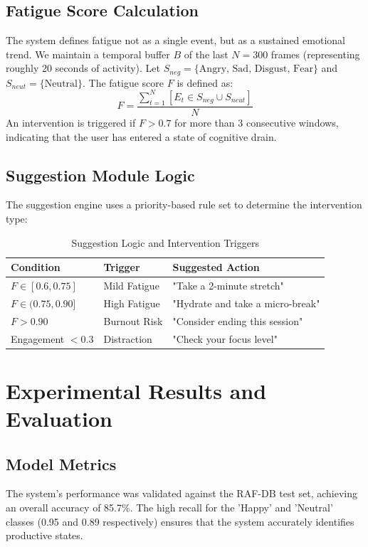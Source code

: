 \documentclass[conference]{IEEEtran}
\begin{document}
\subsection{Fatigue Score Calculation}
The system defines fatigue not as a single event, but as a sustained emotional trend. We maintain a temporal buffer $B$ of the last $N=300$ frames (representing roughly 20 seconds of activity). Let $S_{neg} = \{\text{Angry, Sad, Disgust, Fear}\}$ and $S_{neut} = \{\text{Neutral}\}$. The fatigue score $F$ is defined as:
\begin{equation}
    F = \frac{\sum_{t=1}^{N} [E_t \in S_{neg} \cup S_{neut}]}{N}
\end{equation}
An intervention is triggered if $F > 0.7$ for more than 3 consecutive windows, indicating that the user has entered a state of cognitive drain.

\subsection{Suggestion Module Logic}
The suggestion engine uses a priority-based rule set to determine the intervention type:
\begin{table}[h]
    \centering
    \caption{Suggestion Logic and Intervention Triggers}
    \label{tab:suggestions}
    \fontsize{10}{12}\selectfont
    \begin{tabularx}{\columnwidth}{llX}
        \toprule
        \textbf{Condition} & \textbf{Trigger} & \textbf{Suggested Action} \\
        \midrule
        $F \in [0.6, 0.75]$ & Mild Fatigue & "Take a 2-minute stretch" \\
        $F \in (0.75, 0.90]$ & High Fatigue & "Hydrate and take a micro-break" \\
        $F > 0.90$ & Burnout Risk & "Consider ending this session" \\
        Engagement $< 0.3$ & Distraction & "Check your focus level" \\
        \bottomrule
    \end{tabularx}
\end{table}

\section{Experimental Results and Evaluation}

\subsection{Model Metrics}
The system's performance was validated against the RAF-DB test set, achieving an overall accuracy of 85.7\%. The high recall for the 'Happy' and 'Neutral' classes (0.95 and 0.89 respectively) ensures that the system accurately identifies productive states.
\end{document}
